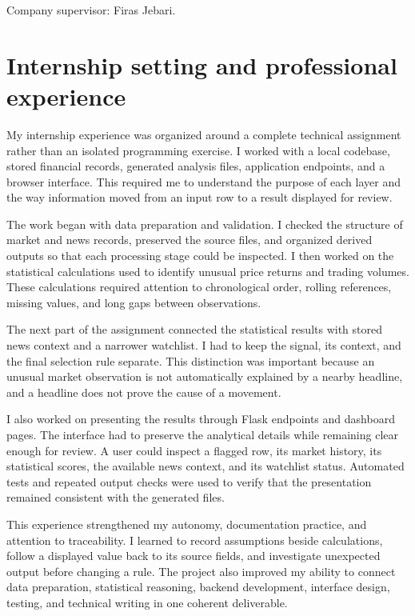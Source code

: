 Company supervisor: Firas Jebari.

\clearpage

\section{Internship setting and professional experience}

My internship experience was organized around a complete technical assignment
rather than an isolated programming exercise. I worked with a local codebase,
stored financial records, generated analysis files, application endpoints, and
a browser interface. This required me to understand the purpose of each layer
and the way information moved from an input row to a result displayed for
review.

The work began with data preparation and validation. I checked the structure
of market and news records, preserved the source files, and organized derived
outputs so that each processing stage could be inspected. I then worked on the
statistical calculations used to identify unusual price returns and trading
volumes. These calculations required attention to chronological order,
rolling references, missing values, and long gaps between observations.

The next part of the assignment connected the statistical results with stored
news context and a narrower watchlist. I had to keep the signal, its context,
and the final selection rule separate. This distinction was important because
an unusual market observation is not automatically explained by a nearby
headline, and a headline does not prove the cause of a movement.

I also worked on presenting the results through Flask endpoints and dashboard
pages. The interface had to preserve the analytical details while remaining
clear enough for review. A user could inspect a flagged row, its market
history, its statistical scores, the available news context, and its watchlist
status. Automated tests and repeated output checks were used to verify that the
presentation remained consistent with the generated files.

This experience strengthened my autonomy, documentation practice, and
attention to traceability. I learned to record assumptions beside
calculations, follow a displayed value back to its source fields, and
investigate unexpected output before changing a rule. The project also
improved my ability to connect data preparation, statistical reasoning,
backend development, interface design, testing, and technical writing in one
coherent deliverable.
